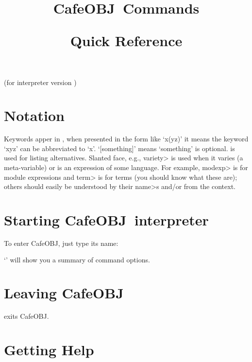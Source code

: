 \def\key#1#2{\leavevmode\hbox to \hsize{\vtop
  {\hsize=.75\hsize\rightskip=1em
  \hskip\keyindent\relax#1}\kbd{#2}\hfil}}

\def\twocol#1#2{\hskip\keyindent\relax\kbd{#1}\hfil&{#2}\hfil\quad\cr}

\def\threecol#1#2#3{\hskip\keyindent\relax\kbd{#1}\hfil&\kbd{#2}\hfil\quad
  &{#3}\hfil\quad\cr}

\def\cafeobj{{\sf CafeOBJ}\null}
\def\bcafeobj{{\bigsf CafeOBJ}\null}
\def\hcafeobj{{\tensf CafeOBJ}\null}



\title{\centerline{\bcafeobj\ Commands}}
\title{\centerline{Quick Reference}}

\centerline{(for interpreter version \version)}

\section{Notation}

Keywords apper in ,
when presented in the form like `x(yz)' it means the keyword `xyz'
can be abbreviated to `x'.
`[something]' means `something' is optional.
\kbd{|} is used for listing alternatives.
Slanted face, e.g., \<variety> is used when it varies (a
meta-variable) or is an expression of some language. For example,
\<modexp> is for module expressions and \<term> is for terms (you
should know what these are); others should easily be understood by
their \<name>s and/or from the context. 
\section{Starting \hcafeobj\ interpreter}

To enter \cafeobj, just type its name: 

`' will show you a summary of command options. 

\section{Leaving \hcafeobj}

 exits \cafeobj.

\section{Getting Help}

